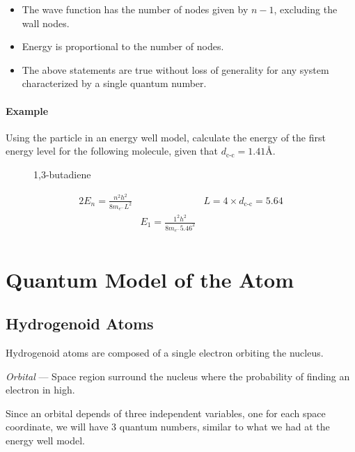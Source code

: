 \documentclass[10pt]{article}
\begin{document}
\begin{itemize}
	\item The wave function has the number of nodes given by $n-1$, excluding the wall nodes.
	\item Energy is proportional to the number of nodes.
	\item The above statements are true without loss of generality for any system characterized by a single quantum number.
\end{itemize}

\paragraph{Example}
Using the particle in an energy well model, calculate the energy of the first energy
level for the following molecule, given that $d_{\text{c-c}}=1.41\si{\angstrom}$.

\begin{figure}[H]
	\centering
	{1,3-butadiene}\label{fig:butadiene}
\end{figure}
\begin{alignat*}{2}
	E_n = \frac{n^2h^2}{8m_{e^{-}}L^2} &                                       & L=4\times d_{\text{c-c}}=5.64 \\
	                                   & E_1 = \frac{1^2h^2}{8m_{e^{-}}5.46^2} &                               \\
\end{alignat*}
\clearpage
\section{Quantum Model of the Atom}
\subsection{Hydrogenoid Atoms}
Hydrogenoid atoms are composed of a single electron orbiting the nucleus.

\emph{Orbital} --- Space region surround the nucleus where the probability of
finding an electron in high.

Since an orbital depends of three independent variables, one for each space
coordinate, we will have 3 quantum numbers, similar to what we had at the energy
well model.
\end{document}
